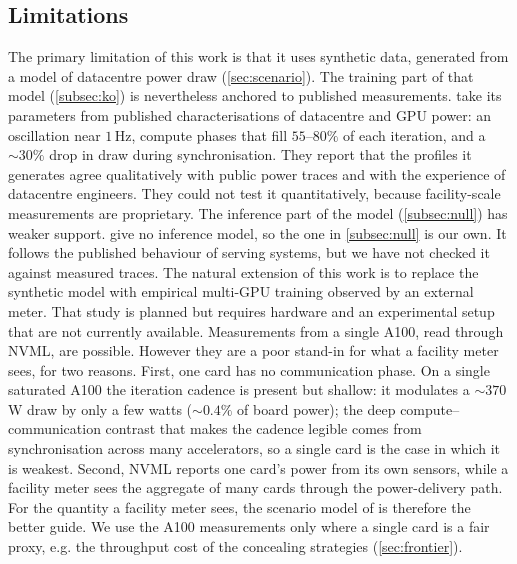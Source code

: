 \documentclass{article}
\begin{document}
\subsection{Limitations}
\label{subsec:limitations}

The primary limitation of this work is that it uses synthetic data, generated
from a model of datacentre power draw (\cref{sec:scenario}). The training part
of that model (\cref{subsec:ko}) is nevertheless anchored to published
measurements. \citet{ko2025widearea} take
its parameters from published characterisations of datacentre and GPU power: an
oscillation near $1$\,Hz, compute phases that fill $55$--$80\%$ of each iteration,
and a ${\sim}30\%$ drop in draw during synchronisation. They report that the
profiles it generates agree qualitatively with public power traces and with the
experience of datacentre engineers. They could not test it quantitatively, because
facility-scale measurements are proprietary. The inference part of the model (\cref{subsec:null}) has weaker
support. \citet{ko2025widearea} give no inference model, so the one in
\cref{subsec:null} is our own. It follows the published behaviour of serving
systems, but we have not checked it against measured traces. The natural extension of this work is to replace the synthetic model with empirical multi-GPU training observed by an external meter. That study is planned but requires hardware and an experimental setup that are not currently available. Measurements from a single A100, read through NVML, are possible. However they are a poor stand-in for what a facility meter sees, for two reasons. First, one card has no communication phase. On a
single saturated A100 the iteration cadence is present but shallow: it modulates
a ${\sim}370$\,W draw by only a few watts (${\sim}0.4\%$ of board power); the deep
compute--communication contrast that makes the cadence legible comes from
synchronisation across many accelerators, so a single card is the case in which
it is weakest. Second, NVML reports one card's power from its own sensors, while
a facility meter sees the aggregate of many cards through the power-delivery
path. For the quantity a facility meter sees, the scenario model of
\citet{ko2025widearea} is therefore the better guide. We use the A100
measurements only where a single card is a fair proxy, e.g. the throughput cost of
the concealing strategies (\cref{sec:frontier}).
\end{document}
